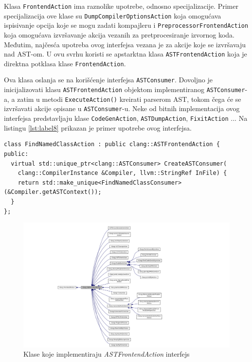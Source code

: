 \documentclass[12pt,oneside]{memoir}
\begin{document}
Klasa \texttt{FrontendAction} ima raznolike upotrebe, odnosno specijalizacije. Primer specijalizacija ove klase su \texttt{DumpCompilerOptionsAction}
koja omogu\'{c}ava ispisivanje opcija koje se mogu zadati kompajleru i \texttt{PreprocessorFrontendAction} koja omogu\'{c}ava izvr\v{s}avanje akcija vezanih za pretprocesiranje izvornog koda. Međutim, naj\v{c}es\'{c}a upotreba ovog interfejsa vezana je za akcije koje se izvr\v{s}avaju nad AST-om. U ovu svrhu koristi se apstarktna klasa \texttt{ASTFrontendAction} koja je direktna potklasa klase \texttt{FrontendAction}. \par
Ova klasa oslanja se na kori\v{s}\'{c}enje interfejsa \texttt{ASTConsumer}. Dovoljno je inicijalizovati klasu \texttt{ASTFrontendAction} objektom implementiranog \texttt{ASTConsumer}-a, a zatim u metodi \texttt{ExecuteAction()} kreirati parserom AST,
tokom \v{c}ega \'{c}e se izvr\v{s}avati akcije opisane u \texttt{ASTConsumer}-u. Neke od bitnih implementacija ovog interfejsa predstavljaju klase \texttt{CodeGenAction}, \texttt{ASTDumpAction}, \texttt{FixitAction} \cite{FrontendAction}...  Na listingu \ref{lst:label8} prikazan je primer upotrebe ovog interfejsa. 
\\
\begin{lstlisting}[style=customc, caption={Primer upotrebe klase \texttt{ASTFrontendAction} interfejsa \cite{ASTToolTutorial}}, label=lst:label8, captionpos=b]
class FindNamedClassAction : public clang::ASTFrontendAction {
public:
  virtual std::unique_ptr<clang::ASTConsumer> CreateASTConsumer(
    clang::CompilerInstance &Compiler, llvm::StringRef InFile) {
    return std::make_unique<FindNamedClassConsumer>(&Compiler.getASTContext());
  }
};

\end{lstlisting}


\begin{figure}[h!]
\begin{center}
\includegraphics[scale=0.4]{ASTFrontendAction.png}
\end{center}
\caption{Klase koje implementiraju \textit{ASTFrontendAction} interfejs}
\label{fig:exploded}
\end{figure}
\end{document}
